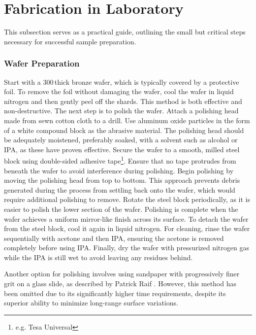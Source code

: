 

\section{Fabrication in Laboratory} 
\label{subsection:realization}
    This subsection serves as a practical guide, outlining the small but critical steps necessary for successful sample preparation. 


    \subsubsection*{Wafer Preparation}
        Start with a 300\,\mum thick bronze wafer, which is typically covered by a protective foil. To remove the foil without damaging the wafer, cool the wafer in liquid nitrogen and then gently peel off the shards. This method is both effective and non-destructive. The next step is to polish the wafer. Attach a polishing head made from sewn cotton cloth to a drill. Use aluminum oxide particles in the form of a white compound block as the abrasive material. The polishing head should be adequately moistened, preferably soaked, with a solvent such as alcohol or IPA, as these have proven effective. Secure the wafer to a smooth, milled steel block using double-sided adhesive tape\footnote{e.g. Tesa Universal}. Ensure that no tape protrudes from beneath the wafer to avoid interference during polishing. Begin polishing by moving the polishing head from top to bottom. This approach prevents debris generated during the process from settling back onto the wafer, which would require additional polishing to remove. Rotate the steel block periodically, as it is easier to polish the lower section of the wafer. Polishing is complete when the wafer achieves a uniform mirror-like finish across its surface. To detach the wafer from the steel block, cool it again in liquid nitrogen. For cleaning, rinse the wafer sequentially with acetone and then IPA, ensuring the acetone is removed completely before using IPA. Finally, dry the wafer with pressurized nitrogen gas while the IPA is still wet to avoid leaving any residues behind. \cite{oberg_machinerys_2000}
        
        Another option for polishing involves using sandpaper with progressively finer grit on a glass slide, as described by Patrick Raif \cite{raif_fabrication_nodate}. However, this method has been omitted due to its significantly higher time requirements, despite its superior ability to minimize long-range surface variations.

